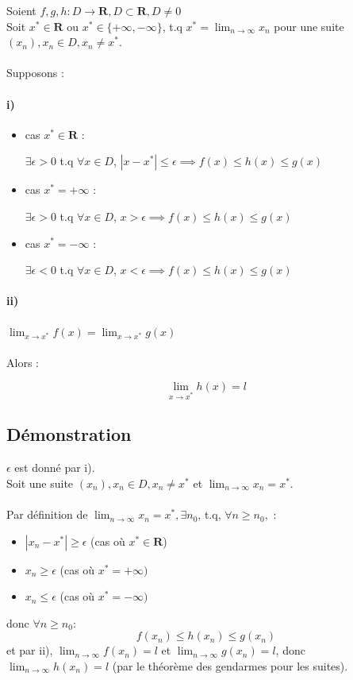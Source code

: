 \documentclass{article}
\begin{document}
Soient $ f, g, h: D \to \mathbf{R}, D \subset \mathbf{R}, D \neq 0 $\\
Soit $ x^* \in \mathbf{R} $ ou $ x^* \in \{+\infty, -\infty\}$, t.q $ x^* = \lim_{n\to\infty} x_n $ pour une suite $ (x_n), x_n \in D, x_n \neq x^* $.\\\\
Supposons :

\paragraph{i)}

\begin{itemize}
    \item cas $ x^* \in \mathbf{R} $ :

$ \exists \epsilon > 0 $ t.q $ \forall x \in D $, $ |x-x^*| \leq \epsilon \implies f(x) \leq h(x) \leq g(x) $

\item cas $ x^* = +\infty $ :

$ \exists \epsilon > 0 $ t.q $ \forall x \in D $, $ x > \epsilon \implies f(x) \leq h(x) \leq g(x) $

\item cas $ x^* = -\infty $ :

$ \exists \epsilon < 0 $ t.q $ \forall x \in D $, $ x < \epsilon \implies f(x) \leq h(x) \leq g(x) $

\end{itemize}

\paragraph{ii)}

$ \lim_{x\to{x^*}} f(x) = \lim_{x\to{x^*}} g(x) $\\\\
Alors : 

\[ \lim_{x\to{x^*}} h(x) = l \]

\subsection{Démonstration}

$ \epsilon $ est donné par i).\\
Soit une suite $ (x_n), x_n \in D, x_n \neq x^* $ et $ \lim_{n\to\infty} x_n = x^* $.\\\\
Par définition de $ \lim_{n\to\infty} x_n = x^*, \exists n_0 $, t.q, $ \forall n \geq n_0, $ :
\begin{itemize}
    \item $ |x_n - x^*| \geq \epsilon $ (cas où $ x^* \in \mathbf{R} $)
    \item $ x_n \geq \epsilon $ (cas où $ x^* = +\infty)$
    \item $ x_n \leq \epsilon $ (cas où $ x^* = -\infty)$
\end{itemize}
donc $ \forall n \geq n_0 $:
\[ f(x_n) \leq h(x_n) \leq g(x_n) \]
et par ii), $ \lim_{n\to\infty} f(x_n) = l $ et $ \lim_{n\to\infty} g(x_n) = l $, donc $ \lim_{n\to\infty} h(x_n) = l $ (par le théorème des gendarmes pour les suites).
\end{document}

